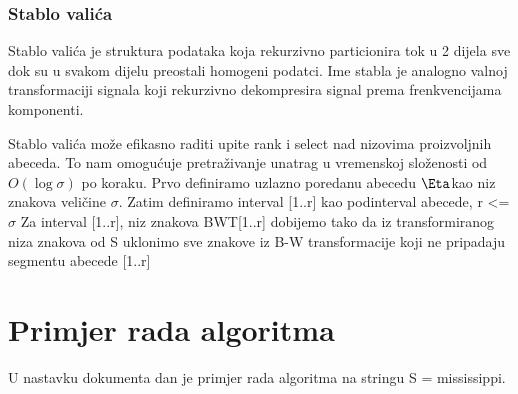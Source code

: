 \documentclass[11pt]{article}
\begin{document}
\newpage

\subsubsection{Stablo valića}
\label{WT_defincija}

Stablo valića je struktura podataka koja rekurzivno particionira tok u 2 dijela sve dok su u svakom dijelu preostali homogeni podatci. Ime stabla je analogno valnoj transformaciji signala koji rekurzivno dekompresira signal prema frenkvencijama komponenti. 

Stablo valića može efikasno raditi upite rank i select nad nizovima proizvoljnih abeceda. To nam omogućuje pretraživanje unatrag u vremenskoj složenosti od  $O(\log\sigma)$ po koraku.
Prvo definiramo uzlazno poredanu abecedu $\Eta$kao niz znakova veličine $\sigma $.  
Zatim definiramo interval [1..r] kao podinterval abecede, r <= $\sigma$
Za interval [1..r], niz znakova BWT[1..r] dobijemo tako da iz transformiranog niza znakova od S uklonimo sve znakove iz B-W transformacije koji ne pripadaju segmentu abecede [1..r]

\section{Primjer rada algoritma}
U nastavku dokumenta dan je primjer rada algoritma na stringu S = mississippi.
\end{document}
